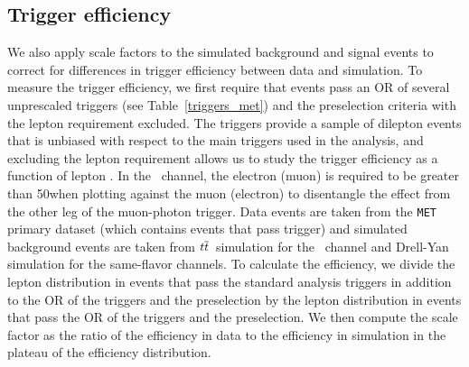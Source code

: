 \subsection{Trigger efficiency}
\label{trigger_eff}
We also apply scale factors to the simulated background and signal events to correct for differences in trigger efficiency between data and simulation. To measure the trigger efficiency, we first require that events pass an OR of several unprescaled \ptmiss triggers (see Table~\ref{triggers_met}) and the preselection criteria with the lepton \pt requirement excluded. The \ptmiss triggers provide a sample of dilepton events that is unbiased with respect to the main triggers used in the analysis, and excluding the lepton \pt requirement allows us to study the trigger efficiency as a function of lepton \pt. In the \Pe\Pgm\ channel, the electron (muon) \pt is required to be greater than 50\GeV when plotting against the muon (electron) \pt to disentangle the effect from the other leg of the muon-photon trigger. Data events are taken from the \texttt{MET} primary dataset (which contains events that pass \ptmiss trigger) and simulated background events are taken from $t\overline{t}$\ simulation for the \Pe\Pgm\ channel and Drell-Yan simulation for the same-flavor channels. To calculate the efficiency, we divide the lepton \pt distribution in events that pass the standard analysis triggers in addition to the OR of the \ptmiss triggers and the preselection by the lepton \pt distribution in events that pass the OR of the \ptmiss triggers and the preselection. We then compute the scale factor as the ratio of the efficiency in data to the efficiency in simulation in the plateau of the efficiency distribution.



\pagebreak